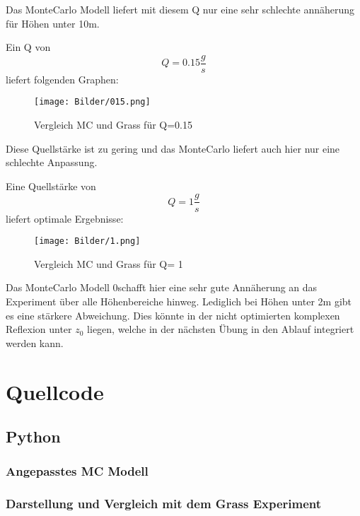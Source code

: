 \documentclass[ngerman]{scrartcl}
\begin{document}
Das  MonteCarlo Modell liefert mit diesem Q nur eine sehr schlechte annäherung für Höhen unter 10m.

Ein Q von
\begin{equation}
Q= 0.15 \frac{g}{s}
\end{equation}
 liefert folgenden Graphen:
\begin{figure}[H]
    \centering
    \texttt{[image: Bilder/015.png]}
    \caption{Vergleich MC und Grass für Q=0.15}
    \label{fig:my_label}
\end{figure}
Diese Quellstärke ist zu gering und das MonteCarlo liefert auch hier nur eine schlechte Anpassung.

Eine Quellstärke von 
\begin{equation}
Q= 1 \frac{g}{s}
\end{equation}
liefert optimale Ergebnisse:
\begin{figure}[H]
    \centering
    \texttt{[image: Bilder/1.png]}
    \caption{Vergleich MC und Grass für Q= 1}
    \label{fig:my_label}
\end{figure}

Das MonteCarlo Modell 0schafft hier eine sehr gute Annäherung an das Experiment über alle Höhenbereiche hinweg. Lediglich bei Höhen unter 2m gibt es eine stärkere Abweichung. Dies könnte in der nicht optimierten komplexen Reflexion unter $z_{0}$ liegen, welche in der nächsten Übung in den Ablauf integriert werden kann.


\section{Quellcode}
\subsection{Python}
\subsubsection{Angepasstes MC Modell}

\subsubsection{Darstellung und Vergleich mit dem Grass Experiment}

\end{document}
